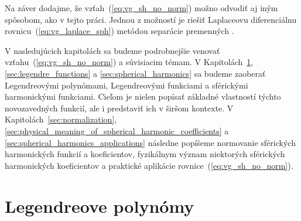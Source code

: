 \documentclass[a4paper, 12pt]{book}
\begin{document}
Na záver dodajme, že vzťah~(\ref{eq:vg_sh_no_norm}) možno odvodiť aj iným 
spôsobom, ako v tejto práci.  Jednou z možností je riešiť Laplaceovu 
diferenciálnu rovnicu~(\ref{eq:vg_laplace_sph}) metódou separácie premenných 
\citep[napríklad][]{MoritzPhysicalGeodesy,Janak2006}.

V nasledujúcich kapitolách sa budeme podrobnejšie venovať 
vzťahu~(\ref{eq:vg_sh_no_norm}) a súvisiacim témam.  
V Kapitolách~\ref{sec:legendre_polynomials}, \ref{sec:legendre_functions} 
a \ref{sec:spherical_harmonics} sa budeme zaoberať Legendreovými polynómami, 
Legendreovými funkciami a sférickými harmonickými funkciami.  Cieľom je nielen 
popísať základné vlastností týchto novozavedných funkcií, ale i predstaviť ich 
v širšom kontexte.  V Kapitolách~\ref{sec:normalization}, 
\ref{sec:physical_meaning_of_spherical_harmonic_coefficients} 
a \ref{sec:spherical_harmonics_applications} následne popíšeme normovanie 
sférických harmonických funkcií a koeficientov, fyzikálnym význam niektorých 
sférických harmonických koeficientov a praktické aplikácie 
rovnice~(\ref{eq:vg_sh_no_norm}).






\section{Legendreove polynómy}
\label{sec:legendre_polynomials}
\end{document}
